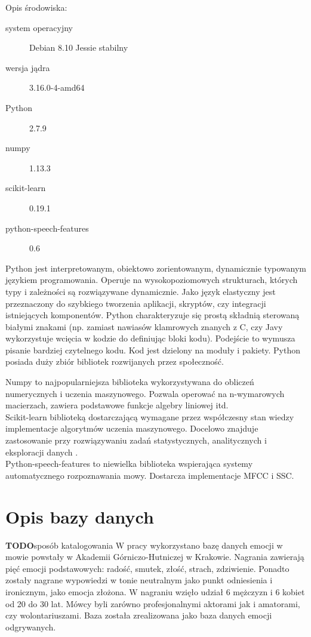\documentclass[a4paper,12pt,twoside,openany]{report}
\newcommand{\TODO}{\textbf{TODO}}
\begin{document}
Opis środowiska:
\begin{description}
	\item [system operacyjny] Debian 8.10 Jessie stabilny 
	\item [wersja jądra] 3.16.0-4-amd64
	\item [Python] 2.7.9
	\item [numpy] 1.13.3
	\item [scikit-learn] 0.19.1
	\item [python-speech-features] 0.6
\end{description}
Python jest interpretowanym, obiektowo zorientowanym, dynamicznie typowanym językiem programowania.
Operuje na wysokopoziomowych strukturach, których typy i zależności są rozwiązywane dynamicznie.
Jako język elastyczny jest przeznaczony do szybkiego tworzenia aplikacji, skryptów, czy integracji istniejących komponentów.
Python charakteryzuje się prostą składnią sterowaną białymi znakami 
(np. zamiast nawiasów klamrowych znanych z C, czy Javy wykorzystuje wcięcia w kodzie do definiując bloki kodu).
Podejście to wymusza pisanie bardziej czytelnego kodu.
Kod jest dzielony na moduły i pakiety.
Python posiada duży zbiór bibliotek rozwijanych przez społeczność.

Numpy to najpopularniejsza biblioteka wykorzystywana do obliczeń numerycznych i uczenia maszynowego.
Pozwala operować na n-wymarowych macierzach, zawiera podstawowe funkcje algebry liniowej itd.
\\
Scikit-learn biblioteką dostarczającą wymagane przez współczesny stan wiedzy implementacje algorytmów uczenia maszynowego.
Docelowo znajduje zastosowanie przy rozwiązywaniu zadań statystycznych, analitycznych i eksploracji danych \cite{OShaughnessy2008}.  
\\
Python-speech-features to niewielka biblioteka wspierająca systemy automatycznego rozpoznawania mowy. 
Dostarcza implementacje MFCC i SSC.

\section{Opis bazy danych}\label{sec:opis_bazy_danych}
\TODO{sposób katalogowania}
W pracy wykorzystano bazę danych emocji w mowie powstały w Akademii Górniczo-Hutniczej w Krakowie.
Nagrania zawierają pięć emocji podstawowych: radość, smutek, złość, strach, zdziwienie.
Ponadto zostały nagrane wypowiedzi w tonie neutralnym jako punkt odniesienia i ironicznym, jako emocja złożona.
W nagraniu wzięło udział 6 mężczyzn i 6 kobiet od 20 do 30 lat. 
Mówcy byli zarówno profesjonalnymi aktorami jak i amatorami, czy wolontariuszami.
Baza została zrealizowana jako baza danych emocji odgrywanych. 
\end{document}
